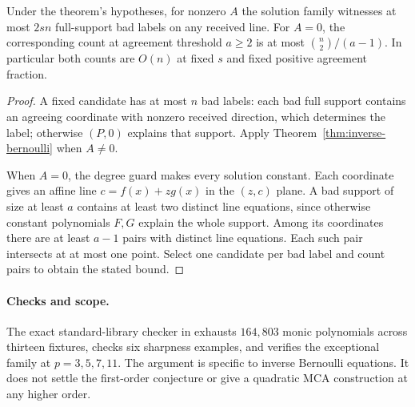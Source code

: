 \begin{corollary}
\label{cor:inverse-bernoulli-mca}
Under the theorem's hypotheses, for nonzero $A$ the solution family
witnesses at most $2sn$ full-support bad labels on any received line.
For $A=0$, the corresponding count at agreement threshold $a\ge2$
is at most $\binom n2/(a-1)$. In particular both counts are $O(n)$
at fixed $s$ and fixed positive agreement fraction.
\end{corollary}
\begin{proof}
A fixed candidate has at most $n$ bad labels: each bad full support
contains an agreeing coordinate with nonzero received direction,
which determines the label; otherwise $(P,0)$ explains that support.
Apply Theorem~\ref{thm:inverse-bernoulli} when $A\ne0$.

When $A=0$, the degree guard makes every solution constant.
Each coordinate gives an affine line $c=f(x)+zg(x)$ in the
$(z,c)$ plane. A bad support of size at least $a$ contains at least
two distinct line equations, since otherwise constant polynomials
$F,G$ explain the whole support. Among its coordinates there are
at least $a-1$ pairs with distinct line equations. Each such pair
intersects at at most one point. Select one candidate per bad label
and count pairs to obtain the stated bound.
\end{proof}

\paragraph{Checks and scope.}
The exact standard-library checker in
 exhausts $164{,}803$ monic
polynomials across thirteen fixtures, checks six sharpness examples,
and verifies the exceptional family at $p=3,5,7,11$.
The argument is specific to inverse Bernoulli equations. It does
not settle the first-order conjecture or give a quadratic MCA
construction at any higher order.
